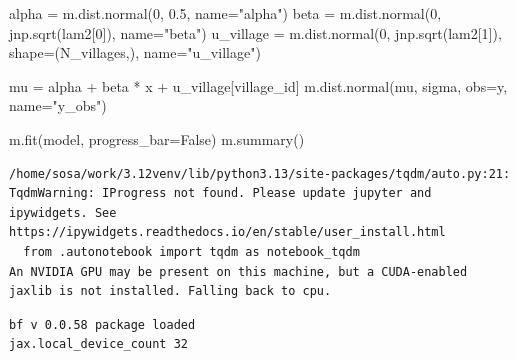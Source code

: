 \documentclass[
  letterpaper,
  DIV=11,
  numbers=noendperiod]{scrartcl}
\newenvironment{Shaded}{\begin{snugshade}}{\end{snugshade}}
\newcommand{\DecValTok}[1]{\textcolor[rgb]{0.68,0.00,0.00}{#1}}
\newcommand{\FloatTok}[1]{\textcolor[rgb]{0.68,0.00,0.00}{#1}}
\newcommand{\NormalTok}[1]{\textcolor[rgb]{0.00,0.23,0.31}{#1}}
\newcommand{\OperatorTok}[1]{\textcolor[rgb]{0.37,0.37,0.37}{#1}}
\newcommand{\StringTok}[1]{\textcolor[rgb]{0.13,0.47,0.30}{#1}}
\newcommand{\VariableTok}[1]{\textcolor[rgb]{0.07,0.07,0.07}{#1}}
\begin{document}
\begin{Shaded}
\begin{Highlighting}[]
\NormalTok{    alpha     }\OperatorTok{=}\NormalTok{ m.dist.normal(}\DecValTok{0}\NormalTok{, }\FloatTok{0.5}\NormalTok{, name}\OperatorTok{=}\StringTok{"alpha"}\NormalTok{)}
\NormalTok{    beta      }\OperatorTok{=}\NormalTok{ m.dist.normal(}\DecValTok{0}\NormalTok{, jnp.sqrt(lam2[}\DecValTok{0}\NormalTok{]), name}\OperatorTok{=}\StringTok{"beta"}\NormalTok{)}
\NormalTok{    u\_village }\OperatorTok{=}\NormalTok{ m.dist.normal(}\DecValTok{0}\NormalTok{, jnp.sqrt(lam2[}\DecValTok{1}\NormalTok{]),}
\NormalTok{                              shape}\OperatorTok{=}\NormalTok{(N\_villages,), name}\OperatorTok{=}\StringTok{"u\_village"}\NormalTok{)}

\NormalTok{    mu }\OperatorTok{=}\NormalTok{ alpha }\OperatorTok{+}\NormalTok{ beta }\OperatorTok{*}\NormalTok{ x }\OperatorTok{+}\NormalTok{ u\_village[village\_id]}
\NormalTok{    m.dist.normal(mu, sigma, obs}\OperatorTok{=}\NormalTok{y, name}\OperatorTok{=}\StringTok{"y\_obs"}\NormalTok{)}

\NormalTok{m.fit(model, progress\_bar}\OperatorTok{=}\VariableTok{False}\NormalTok{)}
\NormalTok{m.summary()}
\end{Highlighting}
\end{Shaded}

\begin{verbatim}
/home/sosa/work/3.12venv/lib/python3.13/site-packages/tqdm/auto.py:21: TqdmWarning: IProgress not found. Please update jupyter and ipywidgets. See https://ipywidgets.readthedocs.io/en/stable/user_install.html
  from .autonotebook import tqdm as notebook_tqdm
An NVIDIA GPU may be present on this machine, but a CUDA-enabled jaxlib is not installed. Falling back to cpu.
\end{verbatim}

\begin{verbatim}
bf v 0.0.58 package loaded
jax.local_device_count 32
\end{verbatim}
\end{document}
